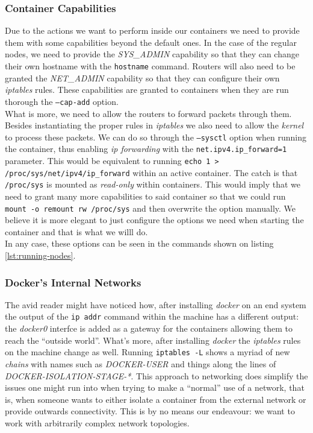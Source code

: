             \subsubsection{Container Capabilities}
                Due to the actions we want to perform inside our containers we need to provide them with some capabilities beyond the default ones. In the case of the regular nodes, we need to provide the \textit{SYS\_ADMIN} capability so that they can change their own hostname with the \texttt{hostname} command. Routers will also need to be granted the \textit{NET\_ADMIN} capability so that they can configure their own \textit{iptables} rules. These capabilities are granted to containers when they are run thorough the \texttt{--cap-add} option.\\

                What is more, we need to allow the routers to forward packets through them. Besides instantiating the proper rules in \textit{iptables} we also need to allow the \textit{kernel} to process these packets. We can do so through the \texttt{--sysctl} option when running the container, thus enabling \textit{ip forwarding} with the \texttt{net.ipv4.ip\_forward=1} parameter. This would be equivalent to running \texttt{\allowbreak echo 1 > /proc/sys/net/ipv4/ip\_forward} within an active container. The catch is that \texttt{/proc/sys} is mounted as \textit{read-only} within containers. This would imply that we need to grant many more capabilities to said container so that we could run \texttt{mount -o remount rw /proc/sys} and then overwrite the option manually. We believe it is more elegant to just configure the options we need when starting the container and that is what we willl do.\\

                In any case, these options can be seen in the commands shown on listing \ref{lst:running-nodes}.\\

            \subsubsection{Docker's Internal Networks}
                The avid reader might have noticed how, after installing \textit{docker} on an end system the output of the \texttt{ip addr} command within the machine has a different output: the \textit{docker0} interfce is added as a gateway for the containers allowing them to reach the ``outside world''. What's more, after installing \textit{docker} the \textit{iptables} rules on the machine change as well. Running \texttt{iptables -L} shows a myriad of new \textit{chains} with names such as \textit{DOCKER-USER} and things along the lines of \textit{DOCKER-ISOLATION-STAGE-*}. This approach to networking does simplify the issues one might run into when trying to make a ``normal'' use of a network, that is, when someone wants to either isolate a container from the external network or provide outwards connectivity. This is by no means our endeavour: we want to work with arbitrarily complex network topologies.\\

